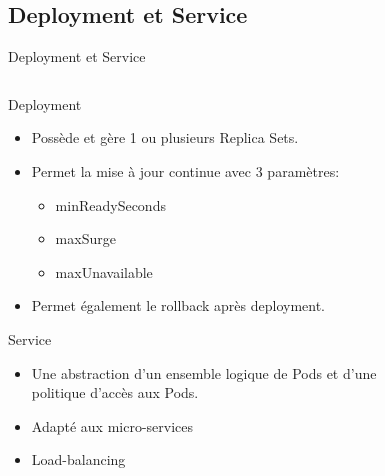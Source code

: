 \documentclass{bredelebeamer}
\begin{document}
\subsection{Deployment et Service}
\begin{frame}{Deployment et Service}
\begin{columns}
\begin{column}{0.6\textwidth}
\begin{block}{Deployment}
\begin{itemize}
	\item Possède et gère 1 ou plusieurs Replica Sets.
	\item Permet la mise à jour continue avec 3 paramètres: 
	\begin{itemize}
	\item minReadySeconds %
	\item maxSurge %
	\item maxUnavailable%
	\end{itemize}
	\item Permet également le rollback après deployment.
\end{itemize}
\end{block}
\begin{exampleblock}{Service}
\begin{itemize}
\item Une abstraction d'un ensemble logique de Pods et d'une politique d'accès aux Pods.
\item Adapté aux micro-services
\item Load-balancing
\end{itemize}
\end{exampleblock}
\end{column}
\begin{column}{0.4\textwidth}
\begin{figure}
\centering

\end{figure}
\end{column}
\end{columns}
\end{frame}
\end{document}
